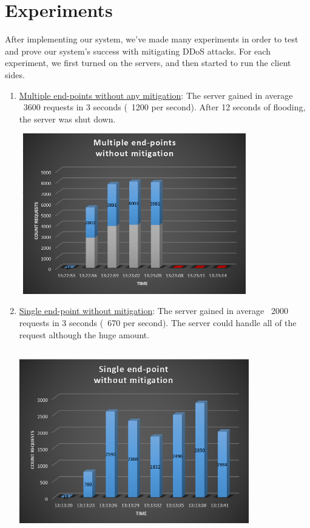 \documentclass{report}
\begin{document}
\section {Experiments} 
After implementing our system, we’ve made many experiments in order to test and prove our system’s success with mitigating \gls{DDoS} attacks. For each experiment, we first turned on the servers, and then started to run the client sides.
\begin{enumerate}
\item\underline {Multiple end-points without any mitigation}:
The server gained in average ~3600 requests in 3 seconds (~1200 per second). After 12 seconds of flooding, the server was shut down.  \hfill \break  \hfill \break
        \begin{minipage}{\linewidth}
            \centering
            \includegraphics[width=10cm,height=7cm,keepaspectratio]{multi_without}
        \end{minipage}
 \hfill \break
\item\underline {Single end-point without mitigation}:
The server gained in average ~2000 requests in 3 seconds (~670 per second). The server could handle all of the request although the huge amount.  \hfill \break  \hfill \break
        \begin{minipage}{\linewidth}
            \centering
            \includegraphics[width=10cm,height=8cm,keepaspectratio]{single}

\end{minipage}
\end{enumerate}
\end{document}
